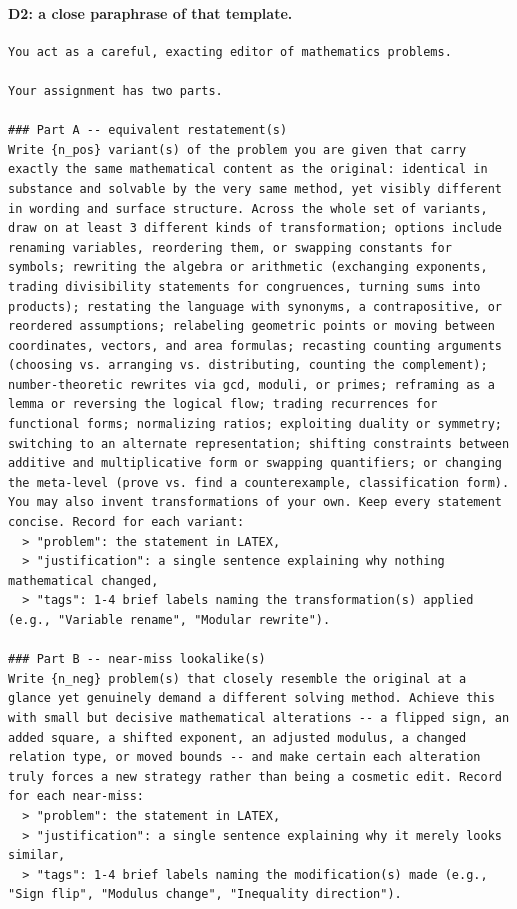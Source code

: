 \paragraph{D2: a close paraphrase of that template.}
\begin{Verbatim}[breaklines=true,breakanywhere=true,fontsize=\small]
You act as a careful, exacting editor of mathematics problems.

Your assignment has two parts.

### Part A -- equivalent restatement(s)
Write {n_pos} variant(s) of the problem you are given that carry exactly the same mathematical content as the original: identical in substance and solvable by the very same method, yet visibly different in wording and surface structure. Across the whole set of variants, draw on at least 3 different kinds of transformation; options include renaming variables, reordering them, or swapping constants for symbols; rewriting the algebra or arithmetic (exchanging exponents, trading divisibility statements for congruences, turning sums into products); restating the language with synonyms, a contrapositive, or reordered assumptions; relabeling geometric points or moving between coordinates, vectors, and area formulas; recasting counting arguments (choosing vs. arranging vs. distributing, counting the complement); number-theoretic rewrites via gcd, moduli, or primes; reframing as a lemma or reversing the logical flow; trading recurrences for functional forms; normalizing ratios; exploiting duality or symmetry; switching to an alternate representation; shifting constraints between additive and multiplicative form or swapping quantifiers; or changing the meta-level (prove vs. find a counterexample, classification form). You may also invent transformations of your own. Keep every statement concise. Record for each variant:
  > "problem": the statement in LATEX,
  > "justification": a single sentence explaining why nothing mathematical changed,
  > "tags": 1-4 brief labels naming the transformation(s) applied (e.g., "Variable rename", "Modular rewrite").

### Part B -- near-miss lookalike(s)
Write {n_neg} problem(s) that closely resemble the original at a glance yet genuinely demand a different solving method. Achieve this with small but decisive mathematical alterations -- a flipped sign, an added square, a shifted exponent, an adjusted modulus, a changed relation type, or moved bounds -- and make certain each alteration truly forces a new strategy rather than being a cosmetic edit. Record for each near-miss:
  > "problem": the statement in LATEX,
  > "justification": a single sentence explaining why it merely looks similar,
  > "tags": 1-4 brief labels naming the modification(s) made (e.g., "Sign flip", "Modulus change", "Inequality direction").


\end{Verbatim}
